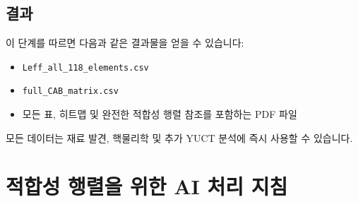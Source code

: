 \documentclass[12pt,a4paper]{article}
\begin{document}
	\subsection*{결과}
	이 단계를 따르면 다음과 같은 결과물을 얻을 수 있습니다:
	\begin{itemize}
		\item \texttt{Leff\_all\_118\_elements.csv}
		\item \texttt{full\_CAB\_matrix.csv}
		\item 모든 표, 히트맵 및 완전한 적합성 행렬 참조를 포함하는 PDF 파일
	\end{itemize}
	모든 데이터는 재료 발견, 핵물리학 및 추가 YUCT 분석에 즉시 사용할 수 있습니다.
	
	\section*{적합성 행렬을 위한 AI 처리 지침}
	\label{sec:ai_instructions}
	
\end{document}
